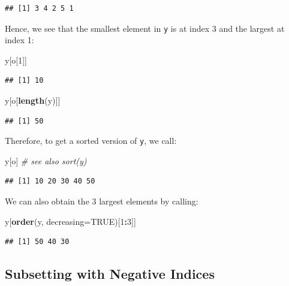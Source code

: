 \documentclass[10pt,b5paper,krantz1]{krantz}
\newenvironment{Shaded}{\begin{snugshade}}{\end{snugshade}}
\newcommand{\CommentTok}[1]{\textcolor[rgb]{0.37,0.37,0.37}{\textit{#1}}}
\newcommand{\DataTypeTok}[1]{\textcolor[rgb]{0.27,0.27,0.27}{#1}}
\newcommand{\DecValTok}[1]{\textcolor[rgb]{0.06,0.06,0.06}{#1}}
\newcommand{\KeywordTok}[1]{\textcolor[rgb]{0.27,0.27,0.27}{\textbf{#1}}}
\newcommand{\NormalTok}[1]{#1}
\newcommand{\OperatorTok}[1]{\textcolor[rgb]{0.43,0.43,0.43}{\textbf{#1}}}
\newcommand{\OtherTok}[1]{\textcolor[rgb]{0.37,0.37,0.37}{#1}}
\begin{document}
\begin{verbatim}
## [1] 3 4 2 5 1
\end{verbatim}

Hence, we see that the smallest element in \texttt{y} is at index 3
and the largest at index 1:

\begin{Shaded}
\begin{Highlighting}[]
\NormalTok{y[o[}\DecValTok{1}\NormalTok{]]}
\end{Highlighting}
\end{Shaded}

\begin{verbatim}
## [1] 10
\end{verbatim}

\begin{Shaded}
\begin{Highlighting}[]
\NormalTok{y[o[}\KeywordTok{length}\NormalTok{(y)]]}
\end{Highlighting}
\end{Shaded}

\begin{verbatim}
## [1] 50
\end{verbatim}

Therefore, to get a sorted version of \texttt{y}, we call:

\begin{Shaded}
\begin{Highlighting}[]
\NormalTok{y[o] }\CommentTok{# see also sort(y)}
\end{Highlighting}
\end{Shaded}

\begin{verbatim}
## [1] 10 20 30 40 50
\end{verbatim}

We can also obtain the 3 largest elements by calling:

\begin{Shaded}
\begin{Highlighting}[]
\NormalTok{y[}\KeywordTok{order}\NormalTok{(y, }\DataTypeTok{decreasing=}\OtherTok{TRUE}\NormalTok{)[}\DecValTok{1}\OperatorTok{:}\DecValTok{3}\NormalTok{]]}
\end{Highlighting}
\end{Shaded}

\begin{verbatim}
## [1] 50 40 30
\end{verbatim}

\hypertarget{subsetting-with-negative-indices}{%
\subsection{Subsetting with Negative Indices}\label{subsetting-with-negative-indices}}
\end{document}
